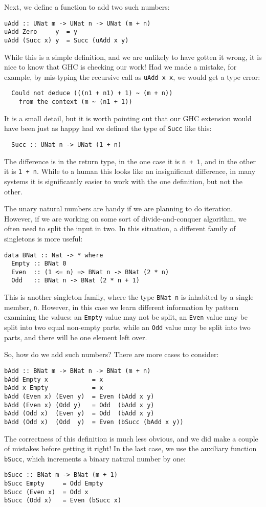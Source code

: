 \documentclass{sigplanconf}
\begin{document}
Next, we define a function to add two such numbers:
\begin{Verbatim}
uAdd :: UNat m -> UNat n -> UNat (m + n)
uAdd Zero     y  = y
uAdd (Succ x) y  = Succ (uAdd x y)
\end{Verbatim}
While this is a simple definition, and we are unlikely
to have gotten it wrong, it is nice to know that GHC
is checking our work!  Had we made a mistake, for
example, by mis-typing the recursive call as \Verb"uAdd x x",
we would get a type error:
\begin{Verbatim}
  Could not deduce (((n1 + n1) + 1) ~ (m + n))
    from the context (m ~ (n1 + 1))
\end{Verbatim}
It is a small detail, but it is worth pointing out that our
GHC extension would have been just as happy had we defined the type
of \Verb"Succ" like this:
\begin{Verbatim}
  Succ :: UNat n -> UNat (1 + n)
\end{Verbatim}
The difference is in the return type, in the one case it is
\Verb"n + 1", and in the other it is \Verb"1 + n".  While
to a human this looks like an insignificant difference,
in many systems it is significantly easier to work
with the one definition, but not the other.

The unary natural numbers are handy if we are planning to
do iteration.  However, if we are working on some sort of
divide-and-conquer algorithm, we often need to split the
input in two.  In this situation, a different family of
singletons is more useful:
\begin{Verbatim}
data BNat :: Nat -> * where
  Empty :: BNat 0
  Even  :: (1 <= n) => BNat n -> BNat (2 * n)
  Odd   :: BNat n -> BNat (2 * n + 1)
\end{Verbatim}
This is another singleton family, where the type \Verb"BNat n"
is inhabited by a single member, \Verb"n".  However, in this
case we learn different information by pattern examining
the values:  an \Verb"Empty" value may not be split,
an \Verb"Even" value may be split into two equal non-empty
parts, while an \Verb"Odd" value may be split into two parts,
and there will be one element left over.

So, how do we add such numbers?  There are more cases to
consider:
\begin{Verbatim}
bAdd :: BNat m -> BNat n -> BNat (m + n)
bAdd Empty x            = x
bAdd x Empty            = x
bAdd (Even x) (Even y)  = Even (bAdd x y)
bAdd (Even x) (Odd y)   = Odd  (bAdd x y)
bAdd (Odd x)  (Even y)  = Odd  (bAdd x y)
bAdd (Odd x)  (Odd  y)  = Even (bSucc (bAdd x y))
\end{Verbatim}
The correctness of this definition is much less obvious,
and we did make a couple of mistakes before getting it
right!  In the last case, we use the auxiliary function
\Verb"bSucc", which increments a binary natural number
by one:
\begin{Verbatim}
bSucc :: BNat m -> BNat (m + 1)
bSucc Empty     = Odd Empty
bSucc (Even x)  = Odd x
bSucc (Odd x)   = Even (bSucc x)
\end{Verbatim}
\end{document}
